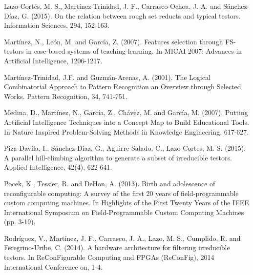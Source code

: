 \documentclass[authoryear,preprint,review,12pt]{elsarticle}
\begin{document}
\begin{thebibliography}{00}
Lazo-Cortés, M. S., Mart\'inez-Trinidad, J. F., Carrasco-Ochoa, J. A. and S\'anchez-D\'iaz, G. (2015). On the relation between rough set reducts and typical testors. Information Sciences, 294, 152-163.

Mart\'inez, N., Le\'on, M. and Garc\'ia, Z. (2007). Features selection through FS-testors in case-based systems of teaching-learning. In MICAI 2007: Advances in Artificial Intelligence, 1206-1217.

Mart\'inez-Trinidad, J.F. and Guzm\'an-Arenas, A. (2001). The Logical Combinatorial Approach to Pattern Recognition an Overview through Selected Works. Pattern Recognition, 34, 741-751.

Medina, D., Mart\'inez, N., Garc\'ia, Z., Ch\'avez, M. and Garc\'ia, M. (2007). Putting Artificial Intelligence Techniques into a Concept Map to Build Educational Tools. In Nature Inspired Problem-Solving Methods in Knowledge Engineering, 617-627.

Piza-Davila, I., S\'anchez-D\'iaz, G., Aguirre-Salado, C., Lazo-Cortes, M. S. (2015). A parallel hill-climbing algorithm to generate a subset of irreducible testors. Applied Intelligence, 42(4), 622-641.

Pocek, K., Tessier, R. and DeHon, A. (2013). Birth and adolescence of reconfigurable computing: A survey of the first 20 years of field-programmable custom computing machines. In Highlights of the First Twenty Years of the IEEE International Symposium on Field-Programmable Custom Computing Machines (pp. 3-19).

 Rodr\'iguez, V., Mart\'inez, J. F., Carrasco, J. A., Lazo, M. S., Cumplido, R. and Feregrino-Uribe, C. (2014). A hardware architecture for filtering irreducible testors. In ReConFigurable Computing and FPGAs (ReConFig), 2014 International Conference on, 1-4.


\end{thebibliography}
\end{document}
